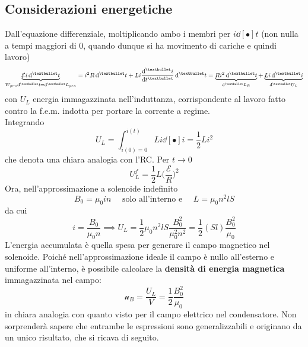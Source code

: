 \subsection{Considerazioni energetiche}

Dall'equazione differenziale, moltiplicando ambo i membri per $i \dd[•]{t}$ (non nulla a tempi maggiori di $0$, quando dunque si ha movimento di cariche e quindi lavoro)
\[\underbrace{\mathcal{E} i \dd[•]{t}}_{W_{gen} \dd[•]{t} = \dd[•]{L_{gen}}} = i^2 R \dd[•]{t} +  L i \dv[•]{i}{t} \dd[•]{t} = \underbrace{R i^2 \dd[•]{t}}_{\dd[•]{L_R}} + \underbrace{L i \dd[•]{i}}_{\dd[•]{U_L}}\]
con $U_L$ energia immagazzinata nell'induttanza, corrispondente al lavoro fatto contro la f.e.m. indotta per portare la corrente a regime.
\\Integrando
\[U_L = \int_{i(0) = 0}^{i(t)} L i \dd[•]{i} = \frac{1}{2} L i^2\]
che denota una chiara analogia con l'RC. Per $t \rightarrow 0$ 
\[U_L^{f} = \frac{1}{2} L \big(\frac{\mathcal{E}}{R}\big)^2\]
Ora, nell'approssimazione a solenoide indefinito
\[B_0 = \mu_0 i n \quad \textrm{ solo all'interno e } \quad L = \mu_0 n^2 l S\]
da cui
\[i = \frac{B_0}{\mu_0 n} \implies U_L = \frac{1}{2} \mu_0 n^2 l S \frac{B_0^2}{\mu_0^2 n^2}= \frac{1}{2} (Sl) \frac{B_0^2}{\mu_0}\]
L'energia accumulata è quella spesa per generare il campo magnetico nel solenoide. Poiché nell'approssimazione ideale il campo è nullo all'esterno e uniforme all'interno, è possibile calcolare la \textbf{densità di energia magnetica} immagazzinata nel campo:
\[\mathcal{u}_B = \frac{U_L}{V} = \frac{1}{2} \frac{B_0^2}{\mu_0}\]
in chiara analogia con quanto visto per il campo elettrico nel condensatore. Non sorprenderà sapere che entrambe le espressioni sono generalizzabili e originano da un unico risultato, che si ricava di seguito.

